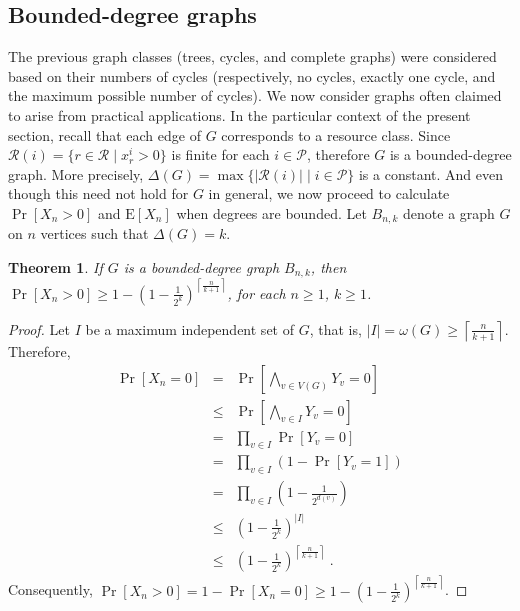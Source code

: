 \documentclass{article}
\newcommand{\st}{\;|\;}
\newcommand{\set}[1][ ]{\{ #1 \}}
\newcommand{\R}{\mathcal{R}}
\newtheorem{thm}[lem]{Theorem}
\begin{document}
\subsection{Bounded-degree graphs}

The previous graph classes (trees, cycles, and complete graphs) were considered
based on their numbers of cycles (respectively, no cycles, exactly one cycle,
and the maximum possible number of cycles). We now consider graphs often claimed
to arise from practical applications. In the particular context of the present
section, recall that each edge of $G$ corresponds to a resource class. Since
$\R(i) = \set [r \in \R \st x^i_r > 0]$ is finite for each $i \in \mathcal{P}$,
therefore $G$ is a bounded-degree graph. More precisely,
$\Delta(G) = \max \set[ |\R(i)| \st i \in \mathcal{P} ]$ is a constant. And even
though this need not hold for $G$ in general, we now proceed to calculate
$\Pr[X_n > 0]$ and $\mathrm{E}[X_n]$ when degrees are bounded. Let $B_{n, k}$
denote a graph $G$ on $n$ vertices such that $\Delta(G) = k$.

\begin{thm}
\label{PXBn}
If $G$ is a bounded-degree graph $B_{n, k}$, then
$\Pr[X_n > 0] \geq 1 - \left( 1 - \frac{1}{2^k} \right)^{\left\lceil \frac{n}{k+1} \right\rceil }$,
for each $n \geq 1$, $k \geq 1$.
\end{thm}

\begin{proof}
Let $I$ be a maximum independent set of $G$, that is,
$|I| = \omega(G) \geq \left\lceil \frac{n}{k+1} \right\rceil$. Therefore,
\begin{eqnarray*}
	 \Pr[X_n = 0] & = & \Pr[\bigwedge_{v \in V(G)} Y_v = 0] \\
				  & \leq & \Pr[\bigwedge_{v \in I} Y_v = 0] \\
				  & = & \prod_{v \in I} \Pr[Y_v = 0] \\
	              & = & \prod_{v \in I} (1 - \Pr[Y_v = 1]) \\
                  & = & \prod_{v \in I} (1 - \frac{1}{2^{d(v)}}) \\
                  & \leq & \left( 1 - \frac{1}{2^k} \right)^{|I|} \\
	              & \leq & \left( 1 - \frac{1}{2^k} \right)^{\left\lceil \frac{n}{k+1} \right\rceil} \;{.}
\end{eqnarray*}
Consequently,
$\Pr[X_n > 0] = 1 - \Pr[X_n = 0] \geq 1 - \left( 1 - \frac{1}{2^k} \right)^{\left\lceil \frac{n}{k+1} \right\rceil }$.
\end{proof}
\end{document}
